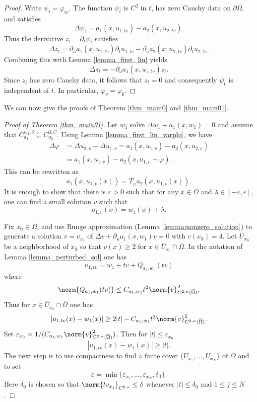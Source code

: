 \documentclass[11pt,a4paper]{amsart}
\theoremstyle{definition}
\numberwithin{equation}{section}
\newcommand{\ol}[1]{\overline{#1}}
\newcommand{\eps}{\varepsilon}
\newcommand{\p}{\partial}
\newcommand{\Om}{\Omega}
\begin{document}
\begin{proof}
Write $\psi_t = \varphi_{tv}$. The function $\psi_t$ is $C^2$ in $t$, has zero Cauchy data on $\p \Om$, and satisfies 
\[
\Delta \psi_t = a_1(x,u_{1,tv}) - a_2(x,u_{2,tv}).
\]
Thus the derivative $z_t = \p_t \psi_t$ satisfies  
\[
\Delta z_t = \p_u a_1(x,u_{1,tv}) \p_t u_{1,tv} - \p_u a_2(x,u_{2,tv}) \p_t u_{2,tv}.
\]
Combining this with Lemma \ref{lemma_first_lin} yields 
\[
\Delta z_t = -\p_u a_1(x,u_{1,tv}) z_t.
\]
Since $z_t$ has zero Cauchy data, it follows that $z_t = 0$ and consequently $\psi_t$ is independent of $t$. In particular, $\varphi_v = \varphi_0$.
\end{proof}

We can now give the proofs of Theorem \ref{thm_main0} and \ref{thm_main01}.

\begin{proof}[Proof of Theorem \ref{thm_main01}]
Let $w_1$ solve $\Delta w_1 + a_1(x,w_1) =0$ and assume that $C_{a_1}^{w_1,\delta} \subseteq C_{a_2}^{0,C}$.  Using Lemma \ref{lemma_first_lin_varphi}, we have 
\begin{align*}
\Delta \varphi &= \Delta u_{2,v} - \Delta u_{1,v} = a_1(x,u_{1,v})-a_2(x,u_{2,v}) \\
 &= a_1(x,u_{1,v})-a_2(x,u_{1,v}+\varphi).
\end{align*}
This can be rewritten as 
\[
a_1(x,u_{1,v}(x)) = T_{\varphi} a_2(x,u_{1,v}(x)).
\]
It is enough to show that there is $\eps > 0$ such that for any $\bar{x} \in \ol{\Om}$ and $\lambda \in [-\eps,\eps]$, one can find a small solution $v$ such that 
\begin{equation} \label{concl1}
u_{1,v}(\bar{x}) = w_1(\bar{x}) + \lambda.
\end{equation}

Fix $x_0 \in \ol{\Om}$, and use Runge approximation (Lemma \ref{lemma:nonzero_solution}) to generate a solution $v = v_{x_0}$ of $\Delta v + \p_u a_1(x,w_1)v = 0$ with $v(x_0) = 4$. Let $U_{x_0}$ be a neighborhood of $x_0$ so that $v(x) \geq 2$ for $x \in \ol{U}_{x_0} \cap \ol{\Om}$. In the notation of Lemma \ref{lemma_perturbed_sol} one has 
\[
u_{1,tv} = w_1 + tv + Q_{a_1,w_1}(tv)
\]
where 
\[
\norm{Q_{a_1,w_1}(tv)} \leq C_{a_1,w_1} t^2 \norm{v}_{C^{2,\alpha}(\ol{\Om})}^2.
\]
Thus for $x \in \ol{U}_{x_0} \cap \ol{\Om}$ one has 
\[
|u_{1,tv}(x) - w_1(x)| \geq 2|t| - C_{a_1,w_1} t^2 \norm{v}_{C^{2,\alpha}(\ol{\Om})}^2.
\]
Set $\eps_{x_0} = 1/(C_{a_1,w_1} \norm{v}_{C^{2,\alpha}(\ol{\Om})}^2)$. Then for $|t| \leq \eps_{x_0}$ 
\[
|u_{1,tv}(x) - w_1(x)| \geq |t|.
\]
The next step is to use compactness to find a finite cover $\{ U_{x_1}, \ldots, U_{x_N} \}$ of $\ol{\Om}$ and to set 
\[
\eps = \min\{ \eps_{x_1}, \ldots, \eps_{x_N}, \delta_0 \}.
\]
Here $\delta_0$ is chosen so that $\norm{t v_{x_j}}_{C^{2,\alpha}} \leq \delta$ whenever $|t| \leq \delta_0$ and $1 \leq j \leq N$.


\end{proof}
\end{document}
